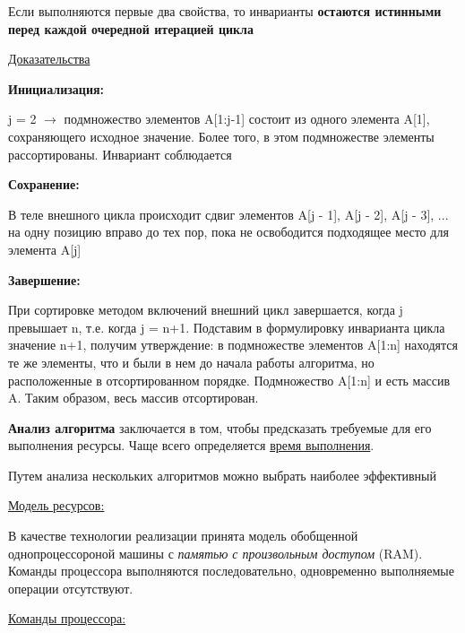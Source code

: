 \documentclass[a4paper, 12pt]{article}
\begin{document}
Если выполняются первые два свойства, то инварианты \textbf{остаются истинными перед каждой очередной итерацией цикла}

\underline{Доказательства}

\textbf{Инициализация:}

j = 2 $\rightarrow$ подмножество элементов A[1:j-1] состоит из одного элемента A[1], сохраняющего исходное значение. 
Более того, в этом подмножестве элементы рассортированы. Инвариант соблюдается

\textbf{Сохранение:} 

В теле внешного цикла происходит сдвиг элементов A[j - 1], A[j - 2], A[j - 3], ... на одну позицию вправо до тех пор, пока не освободится подходящее
место для элемента A[j]

\textbf{Завершение:}

При сортировке методом включений внешний цикл завершается, когда j превышает n, т.е. когда j = n+1. 
Подставим в формулировку инварианта цикла значение n+1, получим утверждение: в подмножестве элементов A[1:n]
находятся те же элементы, что и были в нем до начала работы алгоритма, но расположенные в отсортированном порядке.
Подмножество A[1:n] и есть массив A. Таким образом, весь массив отсортирован.


\textbf{Анализ алгоритма} заключается в том, чтобы предсказать требуемые для его выполнения ресурсы. 
Чаще всего определяется \underline{время выполнения}.

Путем анализа нескольких алгоритмов можно выбрать наиболее эффективный

\underline{Модель ресурсов:}

В качестве технологии реализации принята модель обобщенной однопроцессороной машины с \textit{памятью с произвольным доступом} (RAM).
Команды процессора выполняются последовательно, одновременно выполняемые операции отсутствуют.

\underline{Команды процессора:}
\end{document}
